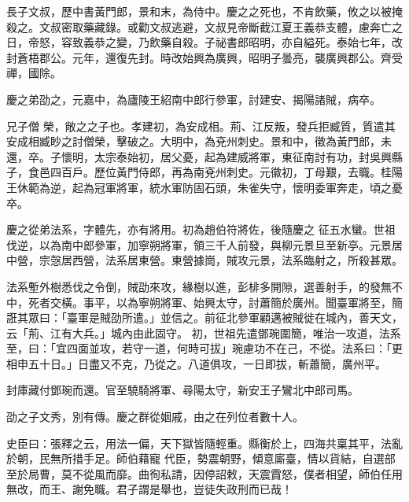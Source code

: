 \begin{pinyinscope}
 長子文叔，歷中書黃門郎，景和末，為侍中。慶之之死也，不肯飲藥，攸之以被掩殺之。文叔密取藥藏錄。或勸文叔逃避，文叔見帝斷截江夏王義恭支體，慮奔亡之日，帝怒，容致義恭之變，乃飲藥自殺。子祕書郎昭明，亦自縊死。泰始七年，改封蒼梧郡公。元年，還復先封。時改始興為廣興，昭明子曇亮，襲廣興郡公。齊受禪，國除。



 慶之弟劭之，元嘉中，為廬陵王紹南中郎行參軍，討建安、揭陽諸賊，病卒。



 兄子僧
 榮，敞之之子也。孝建初，為安成相。荊、江反叛，發兵拒臧質，質遣其安成相臧眇之討僧榮，擊破之。大明中，為兗州刺史。景和中，徵為黃門郎，未還，卒。子懷明，太宗泰始初，居父憂，起為建威將軍，東征南討有功，封吳興縣子，食邑四百戶。歷位黃門侍郎，再為南兗州刺史。元徽初，丁母艱，去職。桂陽王休範為逆，起為冠軍將軍，統水軍防固石頭，朱雀失守，懷明委軍奔走，頃之憂卒。



 慶之從弟法系，字體先，亦有將用。初為趙伯符將佐，後隨慶之
 征五水蠻。世祖伐逆，以為南中郎參軍，加寧朔將軍，領三千人前發，與柳元景旦至新亭。元景居中營，宗愨居西營，法系居東營。東營據崗，賊攻元景，法系臨射之，所殺甚眾。



 法系塹外樹悉伐之令倒，賊劭來攻，緣樹以進，彭棑多開隙，選善射手，的發無不中，死者交橫。事平，以為寧朔將軍、始興太守，討蕭簡於廣州。聞臺軍將至，簡誑其眾曰：「臺軍是賊劭所遣。」並信之。前征北參軍顧邁被賊徙在城內，善天文，云「荊、江有大兵。」城內由此固守。
 初，世祖先遣鄧琬圍簡，唯治一攻道，法系至，曰：「宜四面並攻，若守一道，何時可拔」琬慮功不在己，不從。法系曰：「更相申五十日。」日盡又不克，乃從之。八道俱攻，一日即拔，斬蕭簡，廣州平。



 封庫藏付鄧琬而還。官至驍騎將軍、尋陽太守，新安王子鸞北中郎司馬。



 劭之子文秀，別有傳。慶之群從姻戚，由之在列位者數十人。



 史臣曰：張釋之云，用法一偏，天下獄皆隨輕重。縣衡於上，四海共稟其平，法亂於朝，民無所措手足。師伯藉寵
 代臣，勢震朝野，傾意廝臺，情以貨結，自選部至於局曹，莫不從風而靡。曲徇私請，因停詔敕，天震霣怒，僕者相望，師伯任用無改，而王、謝免職。君子謂是舉也，豈徒失政刑而已哉！



\end{pinyinscope}